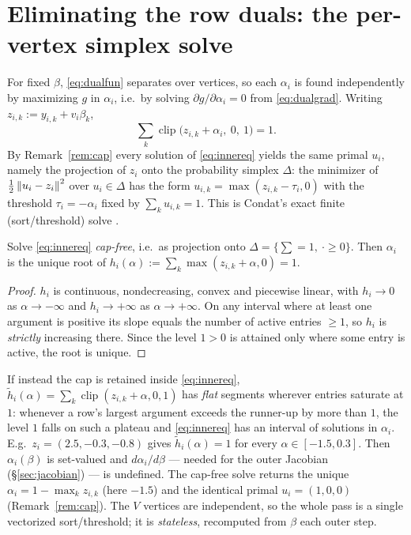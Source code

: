 \documentclass[11pt,a4paper]{article}
\begin{document}
\section{Eliminating the row duals: the per-vertex simplex solve}
\label{sec:inner}
For fixed $\beta$, \eqref{eq:dualfun} separates over vertices, so each $\alpha_i$ is found
independently by maximizing $g$ in $\alpha_i$, i.e.\ by solving $\partial g/\partial\alpha_i=0$
from \eqref{eq:dualgrad}. Writing $z_{i,k}:=y_{i,k}+v_i\beta_k$,
\begin{equation}
  \sum_k \operatorname{clip}\!\bigl(z_{i,k}+\alpha_i,\ 0,\ 1\bigr)=1 .
  \label{eq:innereq}
\end{equation}
By Remark~\ref{rem:cap} every solution of \eqref{eq:innereq} yields the same primal $u_i$,
namely the projection of $z_i$ onto the probability simplex $\Delta$: the minimizer of
$\tfrac12\left\|u_i-z_i\right\|^2$ over $u_i\in\Delta$ has the form $u_{i,k}=\max(z_{i,k}-\tau_i,0)$
with the threshold $\tau_i=-\alpha_i$ fixed by $\sum_k u_{i,k}=1$. This is Condat's exact
finite (sort/threshold) solve \cite{condat2016simplex}.

\begin{prop}
\label{prop:innerunique}
Solve \eqref{eq:innereq} \emph{cap-free}, i.e.\ as projection onto $\Delta=\{\sum=1,\ \cdot\ge0\}$.
Then $\alpha_i$ is the unique root of $h_i(\alpha):=\sum_k\max(z_{i,k}+\alpha,0)=1$.
\end{prop}
\begin{proof}
$h_i$ is continuous, nondecreasing, convex and piecewise linear, with $h_i\to0$ as
$\alpha\to-\infty$ and $h_i\to+\infty$ as $\alpha\to+\infty$. On any interval where at least
one argument is positive its slope equals the number of active entries $\ge1$, so $h_i$ is
\emph{strictly} increasing there. Since the level $1>0$ is attained only where some entry is
active, the root is unique.
\end{proof}

\begin{remark}
\label{rem:capfree}
If instead the cap is retained inside \eqref{eq:innereq}, $\tilde h_i(\alpha)=\sum_k
\operatorname{clip}(z_{i,k}+\alpha,0,1)$ has \emph{flat} segments wherever entries saturate at
$1$: whenever a row's largest argument exceeds the runner-up by more than $1$, the level $1$
falls on such a plateau and \eqref{eq:innereq} has an interval of solutions in $\alpha_i$.
E.g.\ $z_i=(2.5,-0.3,-0.8)$ gives $\tilde h_i(\alpha)=1$ for every $\alpha\in[-1.5,0.3]$.
Then $\alpha_i(\beta)$ is set-valued and $d\alpha_i/d\beta$ --- needed for the outer Jacobian
(\S\ref{sec:jacobian}) --- is undefined. The cap-free solve returns the unique
$\alpha_i=1-\max_k z_{i,k}$ (here $-1.5$) and the identical primal $u_i=(1,0,0)$
(Remark~\ref{rem:cap}). The $V$ vertices are independent, so the whole pass is a single
vectorized sort/threshold; it is \emph{stateless}, recomputed from $\beta$ each outer step.
\end{remark}
\end{document}
